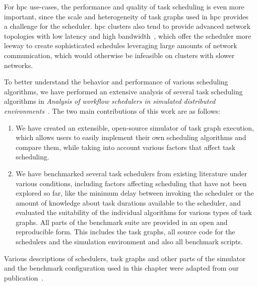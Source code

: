For \gls{hpc} use-cases, the performance and quality of task scheduling is even more
important, since the scale and heterogeneity of task graphs used in \gls{hpc}
provides a challenge for the scheduler. \gls{hpc} clusters also tend to provide
advanced network topologies with low latency and high bandwidth~\cite{dragonfly,slimfly}, which
offer the scheduler more leeway to create sophisticated schedules leveraging large amounts of
network communication, which would otherwise be infeasible on clusters with slower networks.

To better understand the behavior and performance of various scheduling algorithms, we have
performed an extensive analysis of several task scheduling algorithms in
\emph{Analysis of workflow schedulers in simulated distributed environments}~\cite{estee}. The two main contributions of this work are as
follows:
\begin{enumerate}
	\item We have created an extensible, open-source simulator of task graph execution, which allows users to
	      easily implement their own scheduling algorithms and compare them, while taking into account
	      various factors that affect task scheduling.
	\item We have benchmarked several task schedulers from existing literature under various conditions,
	      including factors affecting scheduling that have not been explored so far, like the minimum delay
	      between invoking the scheduler or the amount of knowledge about task durations available to the
	      scheduler, and evaluated the suitability of the individual algorithms for various types of task
	      graphs. All parts of the benchmark suite are provided in an open and reproducible form. This includes the task
	      graphs, all source code for the schedulers and the simulation environment and also all benchmark
	      scripts.
\end{enumerate}

Various descriptions of schedulers, task graphs and other parts of the simulator and the benchmark
configuration used in this chapter were adapted from our publication~\cite{estee}.



